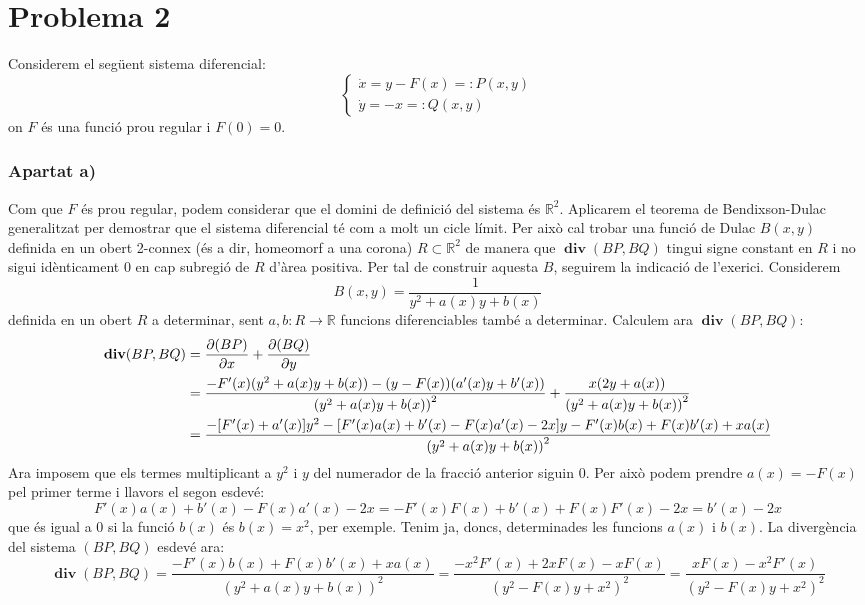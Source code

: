 \documentclass{article}
\newcommand{\RR}{\ensuremath{\mathbb{R}}}
\renewcommand{\div}{\operatorname{\mathbf{div}}} %
\begin{document}
\section*{Problema 2}
Considerem el següent sistema diferencial:
\begin{equation}\label{sist2}
  \begin{cases}
    \dot{x}=y-F(x)=:P(x,y) \\
    \dot{y}=-x=:Q(x,y)
  \end{cases}
\end{equation}
on $F$ és una funció prou regular i $F(0)=0$.
\subsubsection*{Apartat a)}
Com que $F$ és prou regular, podem considerar que el domini de definició del sistema és $\RR^2$. Aplicarem el teorema de Bendixson-Dulac generalitzat per demostrar que el sistema diferencial té com a molt un cicle límit. Per això cal trobar una funció de Dulac $B(x,y)$ definida en un obert 2-connex (és a dir, homeomorf a una corona) $R\subset \RR^2$ de manera que $\div(BP,BQ)$ tingui signe constant en $R$ i no sigui idènticament 0 en cap subregió de $R$ d'àrea positiva. Per tal de construir aquesta $B$, seguirem la indicació de l'exerici. Considerem $$B(x,y)=\frac{1}{y^2+a(x)y+b(x)}$$ definida en un obert $R$ a determinar, sent $a,b:R\rightarrow\RR$ funcions diferenciables també a determinar.
Calculem ara $\div(BP,BQ)$:
\begin{align*}
  \div(BP,BQ) & =\pdv{(BP)}{x}+\pdv{(BQ)}{y}                                                                                                              \\
              & =\frac{-F'(x)(y^2+a(x)y+b(x))-(y-F(x))(a'(x)y+b'(x))}{{\left(y^2+a(x)y+b(x)\right)}^2}+\frac{x(2y+a(x))}{{\left(y^2+a(x)y+b(x)\right)}^2} \\
              & =\frac{-[F'(x)+a'(x)]y^2-[F'(x)a(x)+b'(x)-F(x)a'(x)-2x]y-F'(x)b(x)+F(x)b'(x)+xa(x)}{{\left(y^2+a(x)y+b(x)\right)}^2}
\end{align*}
Ara imposem que els termes multiplicant a $y^2$ i $y$ del numerador de la fracció anterior siguin 0. Per això podem prendre $a(x)=-F(x)$ pel primer terme i llavors el segon esdevé: $$F'(x)a(x)+b'(x)-F(x)a'(x)-2x=-F'(x)F(x)+b'(x)+F(x)F'(x)-2x=b'(x)-2x$$ que és igual a 0 si la funció $b(x)$ és $b(x)=x^2$, per exemple. Tenim ja, doncs, determinades les funcions $a(x)$ i $b(x)$. La divergència del sistema $(BP,BQ)$ esdevé ara:
$$\div(BP,BQ)=\frac{-F'(x)b(x)+F(x)b'(x)+xa(x)}{{\left(y^2+a(x)y+b(x)\right)}^2}=\frac{-x^2F'(x)+2xF(x)-xF(x)}{{\left(y^2-F(x)y+x^2\right)}^2}=\frac{xF(x)-x^2F'(x)}{{\left(y^2-F(x)y+x^2\right)}^2}$$
\end{document}
